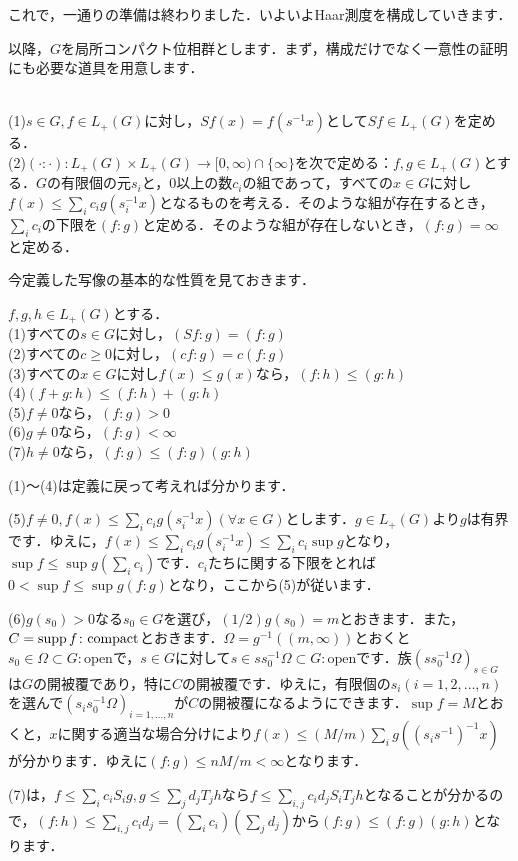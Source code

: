 これで，一通りの準備は終わりました．いよいよHaar測度を構成していきます．

以降，$G$を局所コンパクト位相群とします．まず，構成だけでなく一意性の証明にも必要な道具を用意します．

\begin{ydefi}\label{17}
\leavevmode \\
(1)$s \in G, f \in L_{+}(G)$に対し，$Sf(x)=f(s^{-1}x)$として$Sf \in L_{+}(G)$を定める．\\
(2)$(\cdot : \cdot ) \colon L_{+}(G) \times L_{+}(G) \to [0, \infty) \cap \{ \infty \}$を次で定める：$f, g \in L_{+}(G)$とする．$G$の有限個の元$s_i$と，0以上の数$c_i$の組であって，すべての$x \in G$に対し$f(x) \le \sum_{i}c_{i} g(s_{i}^{-1}x)$となるものを考える．そのような組が存在するとき，$\sum_{i}c_i$の下限を$(f : g)$と定める．そのような組が存在しないとき，$(f : g)=\infty$と定める．
\end{ydefi}
今定義した写像の基本的な性質を見ておきます．
\begin{yprop}\label{18}
$f, g, h \in L_{+}(G)$とする．\\
(1)すべての$s \in G$に対し，$(Sf : g)=(f : g)$\\
(2)すべての$c \ge 0$に対し，$(cf : g)=c(f : g)$\\
(3)すべての$x \in G$に対し$f(x) \le g(x)$なら，$(f : h) \le (g : h)$\\
(4)$(f+g : h) \le (f : h)+(g : h)$\\
(5)$f \ne 0$なら，$( f : g ) > 0$\\
(6)$g \ne 0$なら，$( f : g ) < \infty $\\
(7)$h \ne 0$なら，$( f : g ) \le (f : g ) (g : h )$
\end{yprop}
\begin{Proof}
(1)〜(4)は定義に戻って考えれば分かります．

(5)$f \ne 0, f(x) \le \sum_{i}c_{i} g(s_{i}^{-1}x) (\forall x \in G)$とします．$g \in L_{+}(G)$より$g$は有界です．ゆえに，$f(x) \le \sum_{i}c_{i} g(s_{i}^{-1}x) \le \sum_{i}c_{i} \sup g$となり，$\sup f \le \sup g ( \sum_{i}c_{i} )$です．$c_i$たちに関する下限をとれば$0<\sup f \le \sup g (f : g )$となり，ここから(5)が従います．

(6)$g(s_{0}) > 0$なる$s_{0} \in G$を選び，$(1/2)g(s_{0})=m$とおきます．また，$C=\operatorname{supp} f \colon \mathrm{compact}$とおきます．$\Omega = g^{-1}( (m, \infty) )$とおくと$s_{0} \in \Omega \subset G \colon \mathrm{open}$で，$s \in G$に対して$s \in s s_{0}^{-1} \Omega \subset G \colon \mathrm{open}$です．族$( s s_{0}^{-1}\Omega )_{s \in G}$は$G$の開被覆であり，特に$C$の開被覆です．ゆえに，有限個の$ s_i(i=1,2, \ldots , n)$を選んで$( s_{i} s_{0}^{-1}\Omega )_{i=1,\ldots ,n}$が$C$の開被覆になるようにできます．$\sup f=M$とおくと，$x$に関する適当な場合分けにより$f(x) \le (M/m)\sum_{i} g( (s_{i} s^{-1}) ^{-1}x)$が分かります．ゆえに$(f : g ) \le nM/m < \infty $となります．

(7)は，$f \le \sum_{i} c_{i}S_{i}g, g \le \sum_{j} d_{j}T_{j}h$なら$f \le \sum_{i,j} c_{i}d_{j}S_iT_{j}h$となることが分かるので，$(f : h ) \le \sum_{i,j} c_{i}d_{j} = ( \sum_{i} c_{i} ) (\sum_{j} d_{j} )$から$( f : g ) \le (f : g ) (g : h )$となります．　
\end{Proof}

